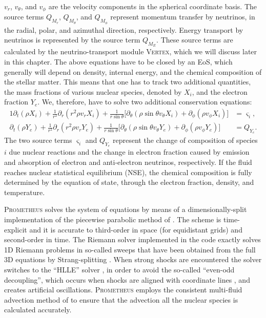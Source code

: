 $v_r$, $v_{\theta}$, and $v_{\phi}$ are the velocity components in the spherical
coordinate basis. The source terms $Q_{M_{r}}$, $Q_{M_{\theta}}$, and $Q_{M_{\phi}}$ represent
momentum transfer by neutrinos, in the radial, polar, and azimuthal direction, respectively.
Energy transport by neutrinos is represented by the source term $Q_{M_{E}}$. These source terms are calculated
by the neutrino-transport module \textsc{Vertex}, which we will discuss later in this chapter.
The above equations have to be closed by an EoS, which generally will depend on 
density, internal energy, and the chemical composition of the stellar matter.
This means that one has to track two additional quantities, the mass fractions
of various nuclear species, denoted by $X_i$, and the electron fraction $Y_e$. We, therefore,
have to solve two additional conservation equations:
\begin{alignat}{1}
\partial_t (\rho X_i) + \frac{1}{r^2} \partial_r (r^2 \rho v_r X_i) + \frac{1}{r \sin{\theta}} \bigg[ \partial_{\theta} (\rho \sin{\theta} v_{\theta} X_i) + \partial_{\phi} (\rho v_{\phi} X_i) \bigg] &= \varsigma_i, \label{eqN:contxi} \\
\partial_t (\rho Y_e) + \frac{1}{r^2} \partial_r (r^2 \rho v_r Y_e) + \frac{1}{r \sin{\theta}} \bigg[ \partial_{\theta} (\rho \sin{\theta} v_{\theta} Y_e) + \partial_{\phi} (\rho v_{\phi} Y_e) \bigg] &= Q_{Y_e}. \label{eqN:contye}
\end{alignat}
The two source terms $\varsigma_i$ and $Q_{Y_e}$ represent the change of composition of species $i$ due nuclear reactions
and the change in electron fraction caused by emission and absorption of electron and anti-electron neutrinos,
respectively. If the fluid reaches nuclear statistical equilibrium (NSE), the chemical 
composition is fully determined by the equation of state, through the electron fraction, density, and
temperature.

\textsc{Prometheus} solves the system of equations
by means of a dimensionally-split implementation of the piecewise parabolic method of \cite{colella_84}.
The scheme is time-explicit and it is accurate to third-order in space (for equidistant grids) and second-order in time.
The Riemann solver implemented in the code exactly solves 1D Riemann problems in so-called sweeps
that have been obtained from the full 3D equations by Strang-splitting \citep{strang_68}.
When strong shocks are encountered the solver switches to the ``HLLE'' solver \citep{einfeldt_88},
in order to avoid the so-called ``even-odd decoupling'', which occurs
when shocks are aligned with coordinate lines \citep{quirk_94,kifonidis_03},
and creates artificial oscillations. \textsc{Prometheus} employs the 
consistent multi-fluid advection method of \cite{plewa_99} to ensure that the advection all the nuclear species
is calculated accurately.

